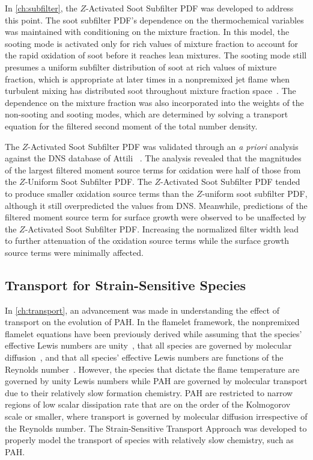 In \cref{ch:subfilter}, the $Z$-Activated Soot Subfilter PDF was developed to address this point. The soot subfilter PDF's dependence on the thermochemical variables was maintained with conditioning on the mixture fraction. In this model, the sooting mode is activated only for rich values of mixture fraction to account for the rapid oxidation of soot before it reaches lean mixtures. The sooting mode still presumes a uniform subfilter distribution of soot at rich values of mixture fraction, which is appropriate at later times in a nonpremixed jet flame when turbulent mixing has distributed soot throughout mixture fraction space~\cite{attili2014}. The dependence on the mixture fraction was also incorporated into the weights of the non-sooting and sooting modes, which are determined by solving a transport equation for the filtered second moment of the total number density.

The $Z$-Activated Soot Subfilter PDF was validated through an \textit{a priori} analysis against the DNS database of Attili \etal~\cite{attili2014}. The analysis revealed that the magnitudes of the largest filtered moment source terms for oxidation were half of those from the $Z$-Uniform Soot Subfilter PDF. The $Z$-Activated Soot Subfilter PDF tended to produce smaller oxidation source terms than the $Z$-uniform soot subfilter PDF, although it still overpredicted the values from DNS. Meanwhile, predictions of the filtered moment source term for surface growth were observed to be unaffected by the $Z$-Activated Soot Subfilter PDF. Increasing the normalized filter width lead to further attenuation of the oxidation source terms while the surface growth source terms were minimally affected.

\subsection{Transport for Strain-Sensitive Species}
\label{sec:conclusion:contributions:transport}

In \cref{ch:transport}, an advancement was made in understanding the effect of transport on the evolution of PAH. In the flamelet framework, the nonpremixed flamelet equations have been previously derived while assuming that the species' effective Lewis numbers are unity~\cite{peters1984}, that all species are governed by molecular diffusion~\cite{pitsch1998}, and that all species' effective Lewis numbers are functions of the Reynolds number~\cite{wang2016}. However, the species that dictate the flame temperature are governed by unity Lewis numbers while PAH are governed by molecular transport due to their relatively slow formation chemistry. PAH are restricted to narrow regions of low scalar dissipation rate that are on the order of the Kolmogorov scale or smaller, where transport is governed by molecular diffusion irrespective of the Reynolds number. The Strain-Sensitive Transport Approach was developed to properly model the transport of species with relatively slow chemistry, such as PAH.

